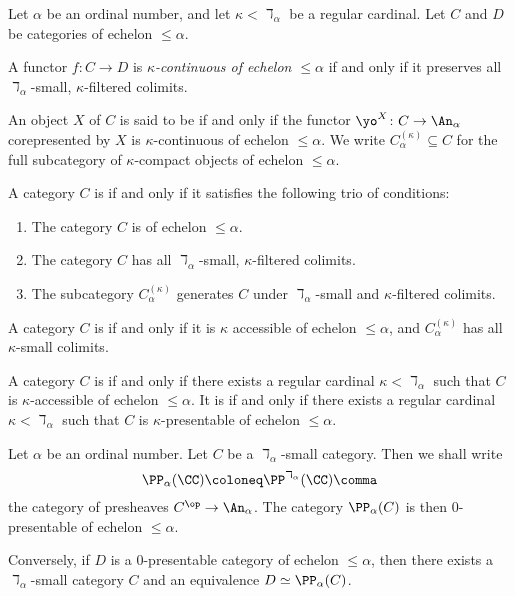 \begin{definition}
	Let $ \alpha $ be an ordinal number, and
	let $ \kappa < \daleth_{\alpha} $ be a regular cardinal.
	Let $ C $ and $ D $ be categories
	of echelon $ \leq \alpha $.

	A functor $ f \colon C \to D $
	is \emph{$ \kappa $-continuous of echelon  $ \leq \alpha $} if and only if 
	it preserves all $ \daleth_{\alpha} $-small, $ \kappa $-filtered colimits.
	
	An object $ X $ of $ C $
	is said to be  if and only if
	the functor $ \yo^X \colon C \to \An_{\alpha} $ corepresented by $ X $
	is $ \kappa $-continuous of echelon $ \leq \alpha $.
	We write $ C^{(\kappa)}_{\alpha} \subseteq C $
	for the full subcategory of $ \kappa $-compact objects of echelon $ \leq \alpha $.

	A category $C$ is
	 if and only if
	it satisfies the following trio of conditions:
	\begin{enumerate}
		\item The category $ C $ is of echelon $ \leq \alpha $.
		\item The category $ C $ has all
			$ \daleth_{\alpha} $-small, $ \kappa $-filtered colimits.
		\item The subcategory $ C^{(\kappa)}_{\alpha} $
			generates $ C $ under $ \daleth_{\alpha} $-small and 
			$ \kappa $-filtered colimits.
	\end{enumerate}
	
	A category $C$ is
	if and only if
	it is $ \kappa $ accessible of echelon $ \leq \alpha $, and  
	$ C^{(\kappa)}_{\alpha} $ has all $ \kappa $-small colimits.

	A category $ C $ is
	if and only if
	there exists a regular cardinal $ \kappa < \daleth_{\alpha} $
	such that $ C $ is $ \kappa $-accessible of echelon $ \leq \alpha $.
	It is
	if and only if
	there exists a regular cardinal $ \kappa < \daleth_{\alpha} $
	such that $ C $ is $ \kappa $-presentable of echelon $ \leq \alpha $.
\end{definition}

\begin{eg}
	Let $ \alpha $ be an ordinal number.
	Let $ C $ be a $ \daleth_{\alpha} $-small category.
	Then we shall write
	\[ \PP_{\alpha}(\CC) \coloneq \PP^{\daleth_{\alpha}}(\CC) \comma \]
	the category of presheaves $ C^{\op} \to \An_{\alpha} $.
	The category $ \PP_{\alpha}(C) $ is then
	$ 0 $-presentable of echelon $ \leq \alpha $.

	Conversely, if $ D $ is a $ 0 $-presentable category
	of echelon $ \leq \alpha $, then 
	there exists a $ \daleth_{\alpha} $-small category $ C $
	and an equivalence $ D \simeq \PP_{\alpha}(C) $.
\end{eg}

